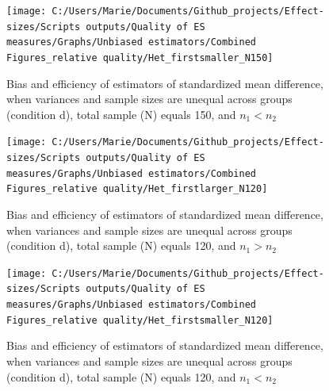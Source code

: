 \documentclass[
  man,floatsintext]{apa6}
\begin{document}
\begin{figure}

{\centering \texttt{[image: C:/Users/Marie/Documents/Github\_projects/Effect-sizes/Scripts outputs/Quality of ES measures/Graphs/Unbiased estimators/Combined Figures\_relative quality/Het\_firstsmaller\_N150]} 

}

\caption{Bias and efficiency of estimators of standardized mean difference, when variances and sample sizes are unequal across groups (condition d), total sample (N) equals 150, and $n_1<n_2$}\label{fig:idHetunbal2}
\end{figure}

\begin{figure}

{\centering \texttt{[image: C:/Users/Marie/Documents/Github\_projects/Effect-sizes/Scripts outputs/Quality of ES measures/Graphs/Unbiased estimators/Combined Figures\_relative quality/Het\_firstlarger\_N120]} 

}

\caption{Bias and efficiency of estimators of standardized mean difference, when variances and sample sizes are unequal across groups (condition d), total sample (N) equals 120, and $n_1>n_2$}\label{fig:idHetunbal3}
\end{figure}

\begin{figure}

{\centering \texttt{[image: C:/Users/Marie/Documents/Github\_projects/Effect-sizes/Scripts outputs/Quality of ES measures/Graphs/Unbiased estimators/Combined Figures\_relative quality/Het\_firstsmaller\_N120]} 

}

\caption{Bias and efficiency of estimators of standardized mean difference, when variances and sample sizes are unequal across groups (condition d), total sample (N) equals 120, and $n_1<n_2$}\label{fig:idHetunbal4}
\end{figure}
\end{document}
